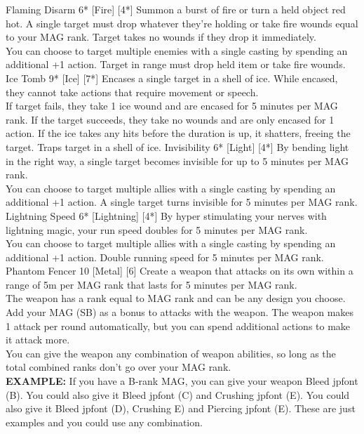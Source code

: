 \begin{pathele}
\spelldescription
{Flaming Disarm}
{6*}
[Fire]
[4*]
{Summon a burst of fire or turn a held object red hot. A single target must drop whatever they're holding or take fire wounds equal to your MAG rank. Target takes no wounds if they drop it immediately.\\
You can choose to target multiple enemies with a single casting by spending an additional +1 action.}
{Target in range must drop held item or take fire wounds.}
\spelldescription
{Ice Tomb}
{9*}
[Ice]
[7*]
{Encases a single target in a shell of ice. While encased, they cannot take actions that require movement or speech.\\If target fails, they take 1 ice wound and are encased for 5 minutes per MAG rank. If the target succeeds, they take no wounds and are only encased for 1 action. If the ice takes any hits before the duration is up, it shatters, freeing the target.}
{Traps target in a shell of ice.}
\spelldescription
{Invisibility}
{6*}
[Light]
[4*]
{By bending light in the right way, a single target becomes invisible for up to 5 minutes per MAG rank.\\You can choose to target multiple allies with a single casting by spending an additional +1 action.}
{A single target turns invisible for 5 minutes per MAG rank.}
\spelldescription
{Lightning Speed}
{6*}
[Lightning]
[4*]
{By hyper stimulating your nerves with lightning magic, your run speed doubles for 5 minutes per MAG rank.\\
You can choose to target multiple allies with a single casting by spending an additional +1 action.}
{Double running speed for 5 minutes per MAG rank.}
\spelldescription
{Phantom Fencer}
{10}
[Metal]
[6]
{Create a weapon that attacks on its own within a range of 5m per MAG rank that lasts for 5 minutes per MAG rank.\\
The weapon has a rank equal to MAG rank and can be any design you choose. Add your MAG (SB) as a bonus to attacks with the weapon. The weapon makes 1 attack per round automatically, but you can spend additional actions to make it attack more.\\
You can give the weapon any combination of weapon abilities, so long as the total combined ranks don't go over your MAG rank.\\
\textbf{EXAMPLE:} If you have a B-rank MAG, you can give your weapon Bleed {jpfont (B)}. You could also give it Bleed {jpfont (C)} and Crushing {jpfont (E)}. You could also give it Bleed {jpfont (D)}, Crushing E) and Piercing {jpfont (E)}. These are just examples and you could use any combination.}

\end{pathele}
